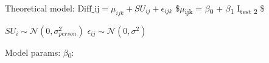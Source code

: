 \documentclass[11pt]{article}
\begin{document}
Theoretical model:
\(\text{Diff_{ij}} = \mu_{ijk} + SU_{ij} + \epsilon_{ijk}\)
\$\(\mu\)\textsubscript{ijk} = \(\beta\)\textsubscript{0} + \(\beta\)\textsubscript{1} I\textsubscript{test 2}  \$

\(SU_{i} \sim \mathcal{N} (0, \sigma^2_{person})\)
\(\epsilon_{ij} \sim \mathcal{N} (0, \sigma^2)\)

Model params:
\(\beta\)\textsubscript{0}: 
\end{document}
